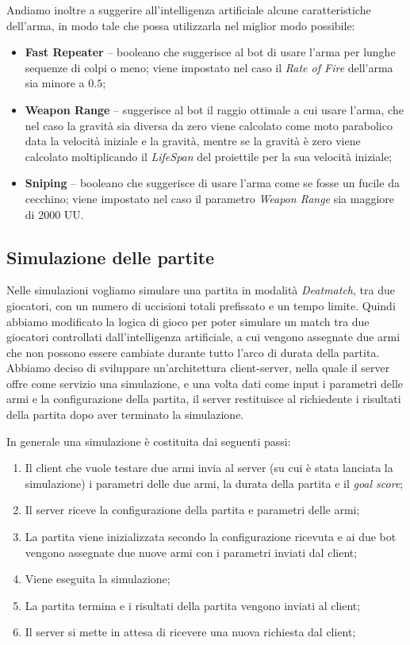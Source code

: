 \documentclass[12pt, italian]{toptesi}
\begin{document}
Andiamo inoltre a suggerire all'intelligenza artificiale alcune caratteristiche dell'arma, in modo tale che possa utilizzarla nel miglior modo possibile:
\begin{itemize}
\item \textbf{Fast Repeater} -- booleano che suggerisce al bot di usare l'arma per lunghe sequenze di colpi o meno;  viene impostato nel caso il \emph{Rate of Fire} dell'arma sia minore a $0.5$;
\item \textbf{Weapon Range} -- suggerisce al bot il raggio ottimale a cui usare l'arma, che nel caso la gravità sia diversa da zero viene calcolato come moto parabolico data la velocità iniziale e la gravità, mentre se la gravità è zero viene calcolato moltiplicando il \emph{LifeSpan} del proiettile per la sua velocità iniziale;
\item \textbf{Sniping} -- booleano che suggerisce di usare l'arma come se fosse un fucile da cecchino; viene impostato nel caso il parametro \emph{Weapon Range} sia maggiore di 2000 UU. 

\end{itemize}

\subsection{Simulazione delle partite}
\label{sec:simulation}
Nelle simulazioni vogliamo simulare una partita in modalità \emph{Deatmatch}, tra due giocatori, con un numero di uccisioni totali prefissato e un tempo limite.
Quindi abbiamo modificato la logica di gioco per poter simulare un match tra due giocatori controllati dall'intelligenza artificiale, a cui vengono assegnate due armi che non possono essere cambiate durante tutto l'arco di durata della partita.
Abbiamo deciso di sviluppare un'architettura client-server, nella quale il server offre come servizio una simulazione, e una volta dati come input i parametri delle armi e la configurazione della partita, il server restituisce al richiedente i risultati della partita dopo aver terminato la simulazione.

In generale una simulazione è costituita dai seguenti passi:
\begin{enumerate}
\item Il client che vuole testare due armi invia al server (su cui è stata lanciata la simulazione) i parametri delle due armi, la durata della partita e il \emph{goal score};
\item Il server riceve la configurazione della partita e parametri delle armi;
\item La partita viene inizializzata secondo la configurazione ricevuta e ai due bot vengono assegnate due nuove armi con i parametri inviati dal client;
\item Viene eseguita la simulazione;
\item La partita termina e i risultati della partita vengono inviati al client;
\item Il server si mette in attesa di ricevere una nuova richiesta dal client;
\end{enumerate}
\end{document}
